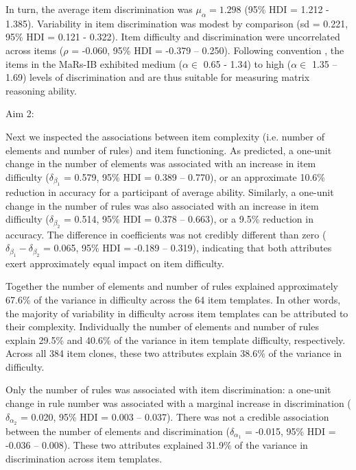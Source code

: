 \documentclass[a4paper,man,natbib]{apa6}
\makeatletter
\renewcommand{\subsubsection}{\@startsection{subsubsection}{3}
  {\z@}%
  {\b@level@two@skip}{\e@level@two@skip}%
  {\normalfont\normalsize\bfseries}}
\makeatother
\begin{document}
In turn, the average item discrimination was $\mu_\alpha = 1.298$ (95\% HDI = 1.212 - 1.385). Variability in item discrimination was modest by comparison (sd = 0.221, 95\% HDI = 0.121 - 0.322). Item difficulty and discrimination were uncorrelated across items ($\rho$ = -0.060, 95\% HDI = -0.379 -- 0.250). Following convention \citep{baker2017basics}, the items in the MaRs-IB exhibited medium ($\alpha \in$ 0.65 - 1.34) to high ($\alpha \in$ 1.35 – 1.69) levels of discrimination and are thus suitable for measuring matrix reasoning ability.

\subsubsection{Aim 2:}


Next we inspected the associations between item complexity (i.e. number of elements and number of rules) and item functioning. As predicted, a one-unit change in the number of elements was associated with an increase in item difficulty ($\delta_{\beta_1}$ = 0.579, 95\% HDI = 0.389 -- 0.770), or an approximate 10.6\% reduction in accuracy for a participant of average ability. Similarly, a one-unit change in the number of rules was also associated with an increase in item difficulty ($\delta_{\beta_2}$ = 0.514, 95\% HDI = 0.378 -- 0.663), or a 9.5\% reduction in accuracy. The difference in coefficients was not credibly different than zero ($\delta_{\beta_1} - \delta_{\beta_2}$ = 0.065, 95\% HDI = -0.189 -- 0.319), indicating that both attributes exert approximately equal impact on item difficulty.

Together the number of elements and number of rules explained approximately 67.6\% of the variance in difficulty across the 64 item templates. In other words, the majority of variability in difficulty across item templates can be attributed to their complexity. Individually the number of elements and number of rules explain 29.5\% and 40.6\% of the variance in item template difficulty, respectively. Across all 384 item clones, these two attributes explain 38.6\% of the variance in difficulty.

Only the number of rules was associated with item discrimination: a one-unit change in rule number was associated with a marginal increase in discrimination ($\delta_{\alpha_2}$ = 0.020, 95\% HDI = 0.003 -- 0.037). There was not a credible association between the number of elements and discrimination ($\delta_{\alpha_1}$ = -0.015, 95\% HDI = -0.036 -- 0.008). These two attributes explained 31.9\% of the variance in discrimination across item templates. 
\end{document}
